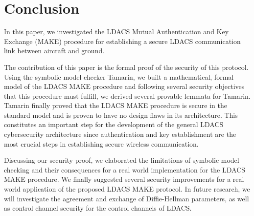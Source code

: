 \section{Conclusion}
\label{Conclusion}
In this paper, we investigated the LDACS Mutual Authentication and Key Exchange (MAKE) procedure for establishing a secure LDACS communication link between aircraft and ground.

\vspace{0.5em}
The contribution of this paper is the formal proof of the security of this protocol.
Using the symbolic model checker Tamarin, we built a mathematical, formal model of the LDACS MAKE procedure and following several security objectives that this procedure must fulfill, we derived several provable lemmata for Tamarin.
Tamarin finally proved that the LDACS MAKE procedure is secure in the standard model and is proven to have no design flaws in its architecture.
This constitutes an important step for the development of the general LDACS cybersecurity architecture since authentication and key establishment are the most crucial steps in establishing secure wireless communication.

\vspace{0.5em}
Discussing our security proof, we elaborated the limitations of symbolic model checking and their consequences for a real world implementation for the LDACS MAKE procedure. We finally suggested several security improvements for a real world application of the proposed LDACS MAKE protocol.
In future research, we will investigate the agreement and exchange of Diffie-Hellman parameters, as well as control channel security for the control channels of LDACS.

